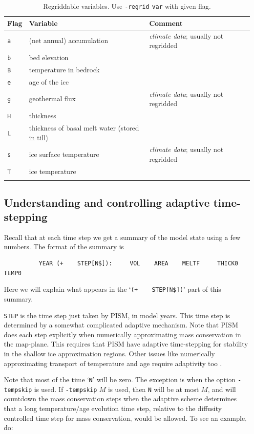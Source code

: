 \documentclass[11pt,final]{amsart}
\begin{document}
\begin{table}[ht]
\caption{Regriddable variables.  Use \texttt{-regrid$\underline{\phantom{b}}$var} with given flag.}\label{tab:regridvar}
\begin{tabular}{@{}llll}\hline
\textbf{Flag} & \textbf{Variable} & \textbf{Comment}\\ \hline
\verb|a| & (net annual) accumulation & \emph{climate data}; usually not regridded \\
\verb|b| & bed elevation & \\
\verb|B| & temperature in bedrock & \\
\verb|e| & age of the ice & \\
\verb|g| & geothermal flux & \emph{climate data}; usually not regridded \\
\verb|H| & thickness & \\
\verb|L| & thickness of basal melt water (stored in till) & \\
\verb|s| & ice surface temperature & \emph{climate data}; usually not regridded\\
\verb|T| & ice temperature & \\
\hline
\normalsize
\end{tabular}
\end{table}


\subsection{Understanding and controlling adaptive time-stepping} \label{subsect:adapt} Recall that at each time step we get a summary of the model state using a few numbers.  The format of the summary is
\begin{verbatim}
          YEAR (+    STEP[N$]):     VOL    AREA    MELTF     THICK0     TEMP0
\end{verbatim}
Here we will explain what appears in the `\verb|(+    STEP[N$])|' part of this summary.

\verb|STEP| is the time step just taken by PISM, in model years.  This time step is determined by a somewhat complicated adaptive mechanism.  Note that PISM does each step explicitly when numerically approximating mass conservation in the map-plane.  This requires that PISM have adaptive time-stepping for stability in the shallow ice approximation regions.  Other issues like numerically approximating transport of temperature and age require adaptivity too \cite{BBL}.

Note that most of the time `\verb|N|' will be zero.  The exception is when the option \verb|-tempskip| is used.  If \verb|-tempskip| $M$ is used, then \verb|N| will be at most $M$, and will countdown the mass conservation steps when the adaptive scheme determines that a long temperature/age evolution time step, relative to the diffusity controlled time step for mass conservation, would be allowed.  To see an example, do:
\end{document}
